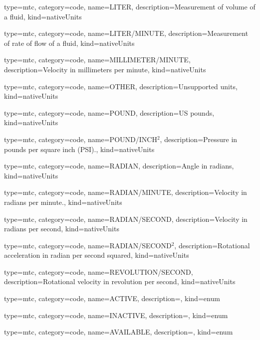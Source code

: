 {
  type=mtc,
  category=code,
  name={LITER},
  description={Measurement of volume of a fluid},
  kind={nativeUnits}
}


{
  type=mtc,
  category=code,
  name={LITER/MINUTE},
  description={Measurement of rate of flow of a fluid},
  kind={nativeUnits}
}


{
  type=mtc,
  category=code,
  name={MILLIMETER/MINUTE},
  description={Velocity in millimeters per minute},
  kind={nativeUnits}
}


{
  type=mtc,
  category=code,
  name={OTHER},
  description={Unsupported units},
  kind={nativeUnits}
}


{
  type=mtc,
  category=code,
  name={POUND},
  description={US pounds},
  kind={nativeUnits}
}


{
  type=mtc,
  category=code,
  name={POUND/INCH$^2$},
  description={Pressure in pounds per square inch (PSI).},
  kind={nativeUnits}
}


{
  type=mtc,
  category=code,
  name={RADIAN},
  description={Angle in radians},
  kind={nativeUnits}
}


{
  type=mtc,
  category=code,
  name={RADIAN/MINUTE},
  description={Velocity in radians per minute.},
  kind={nativeUnits}
}


{
  type=mtc,
  category=code,
  name={RADIAN/SECOND},
  description={Velocity in radians per second},
  kind={nativeUnits}
}


{
  type=mtc,
  category=code,
  name={RADIAN/SECOND$^2$},
  description={Rotational acceleration in radian per second squared},
  kind={nativeUnits}
}


{
  type=mtc,
  category=code,
  name={REVOLUTION/SECOND},
  description={Rotational velocity in revolution per second},
  kind={nativeUnits}
}


{
  type=mtc,
  category=code,
  name={ACTIVE},
  description={},
  kind={enum}
}


{
  type=mtc,
  category=code,
  name={INACTIVE},
  description={},
  kind={enum}
}


{
  type=mtc,
  category=code,
  name={AVAILABLE},
  description={},
  kind={enum}
}


